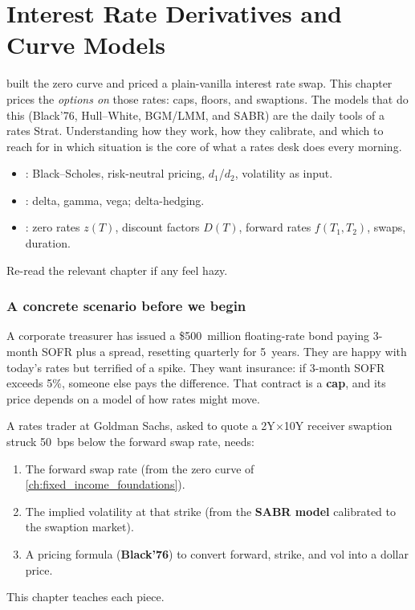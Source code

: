 \chapter{Interest Rate Derivatives and Curve Models}
\label{ch:rates_derivatives}

 built the zero curve and priced a
plain-vanilla interest rate swap.  This chapter prices the
\emph{options on} those rates: caps, floors, and swaptions.  The
models that do this (Black'76, Hull--White, BGM/LMM, and SABR)
are the daily tools of a rates Strat.  Understanding how they work,
how they calibrate, and which to reach for in which situation is the
core of what a rates desk does every morning.

\begin{backgroundbox}[Prerequisites]
\begin{itemize}
  \item {}: Black--Scholes, risk-neutral pricing,
    $d_1$/$d_2$, volatility as input.
  \item {}: delta, gamma, vega; delta-hedging.
  \item {}: zero rates $z(T)$,
    discount factors $D(T)$, forward rates $f(T_1,T_2)$, swaps,
    duration.
\end{itemize}
Re-read the relevant chapter if any feel hazy.
\end{backgroundbox}

\subsection*{A concrete scenario before we begin}

A corporate treasurer has issued a \$500~million floating-rate bond
paying 3-month SOFR plus a spread, resetting quarterly for 5~years.
They are happy with today's rates but terrified of a spike.  They want
insurance: if 3-month SOFR exceeds 5\%, someone else pays the
difference.  That contract is a \textbf{cap}, and its price depends on
a model of how rates might move.

A rates trader at Goldman Sachs, asked to quote a 2Y$\times$10Y
receiver swaption struck 50~bps below the forward swap rate, needs:
\begin{enumerate}
  \item The forward swap rate (from the zero curve of
    \cref{ch:fixed_income_foundations}).
  \item The implied volatility at that strike (from the \textbf{SABR
    model} calibrated to the swaption market).
  \item A pricing formula (\textbf{Black'76}) to convert forward,
    strike, and vol into a dollar price.
\end{enumerate}
This chapter teaches each piece.

